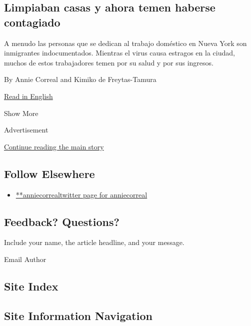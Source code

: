 \begin{enumerate}
  \hypertarget{limpiaban-casas-y-ahora-temen-haberse-contagiado}{%
  \subsection{Limpiaban casas y ahora temen haberse
  contagiado}\label{limpiaban-casas-y-ahora-temen-haberse-contagiado}}

  A menudo las personas que se dedican al trabajo doméstico en Nueva
  York son inmigrantes indocumentados. Mientras el virus causa estragos
  en la ciudad, muchos de estos trabajadores temen por su salud y por
  sus ingresos.

  By Annie Correal and Kimiko de Freytas-Tamura

  \href{https://www.nytimes3xbfgragh.onion/2020/04/06/nyregion/coronavirus-nyc-house-cleaners.html}{Read
  in English}
\end{enumerate}

Show More

Advertisement

\protect\hyperlink{after-mid2}{Continue reading the main story}

\hypertarget{follow-elsewhere}{%
\subsection{Follow Elsewhere}\label{follow-elsewhere}}

\begin{itemize}
\tightlist
\item
  \href{https://twitter.com/anniecorreal}{**anniecorrealtwitter page for
  anniecorreal}
\end{itemize}

\hypertarget{feedback-questions}{%
\subsection{Feedback? Questions?}\label{feedback-questions}}

Include your name, the article headline, and your message.

Email Author

\hypertarget{site-index}{%
\subsection{Site Index}\label{site-index}}

\hypertarget{site-information-navigation}{%
\subsection{Site Information
Navigation}\label{site-information-navigation}}

